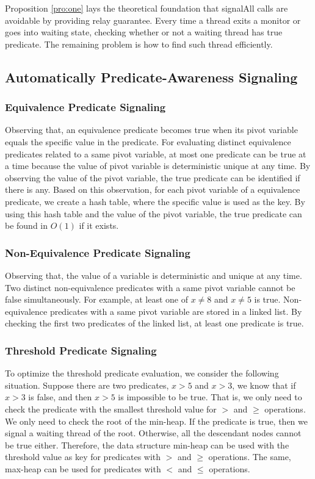 \documentclass[preprint]{sigplanconf}
\begin{document}
Proposition \ref{pro:one} lays the theoretical foundation that signalAll calls
are avoidable by providing relay guarantee. Every time a
thread exits a monitor or goes into waiting state, checking whether or not a
waiting thread has true predicate. The remaining problem is how to find such
thread efficiently. 
\subsection{Automatically Predicate-Awareness Signaling}

\subsubsection{Equivalence Predicate Signaling}
Observing that, an equivalence predicate becomes true when its pivot variable 
equals the specific value in the predicate. For evaluating distinct
equivalence predicates related to a same pivot variable, at most one
predicate can be true at a time because the value of pivot variable is 
deterministic unique at any time. By observing the value of the pivot variable, 
the true predicate can be identified if there is any. Based on this 
observation, for each pivot variable of a equivalence predicate, we create a 
hash table, where the specific value is used as the key. By using this hash 
table and the value of the pivot variable, the true predicate can be found in 
$O(1)$ if it exists.

\subsubsection{Non-Equivalence Predicate Signaling}
Observing that, the value of a variable is deterministic and unique at any 
time. Two distinct non-equivalence predicates with a same pivot variable cannot
be false simultaneously. For example, at least one of $x \ne 8$ and $x \ne 5$
is true. Non-equivalence predicates with a same pivot variable are stored in
a linked list. By checking the first two predicates of the 
linked list, at least one predicate is true. 

\subsubsection{Threshold Predicate Signaling}

To optimize the threshold predicate evaluation, we consider the following
situation. Suppose there are two predicates, $x > 5$ and $x > 3$, we know 
that if $x > 3$ is false, and then $x > 5$ is impossible to be true. That is,
we only need to check the predicate with the smallest threshold value for $>$
and $\ge$ operations. We only need to check the root of the min-heap. If the 
predicate is true, then we signal a waiting thread of the root. Otherwise, all 
the descendant nodes cannot be true either.  Therefore, the data structure 
min-heap can be used with 
the threshold value as key for predicates with $>$ and $\ge$ operations. The 
same, max-heap can be used for predicates with $<$ and $\le$ operations.
\end{document}
